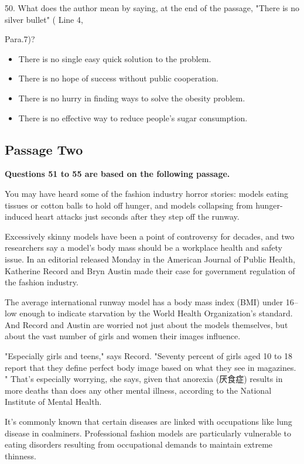 \documentclass[UTF8,11pt]{ctexart}
\begin{document}
50. What does the author mean by saying, at the end of the passage, "There is no silver bullet" ( Line 4,


Para.7)?


\begin{itemize}[leftmargin=2em,itemsep=.2em,topsep=.4em]\item[A.] There is no single easy quick solution to the problem.
\item[B.] There is no hope of success without public cooperation.
\item[C.] There is no hurry in finding ways to solve the obesity problem.
\item[D.] There is no effective way to reduce people's sugar consumption.
\end{itemize}

\subsection*{\textbf{Passage Two}}


\textbf{Questions 51 to 55 are based on the following passage.}


You may have heard some of the fashion industry horror stories: models eating tissues or cotton balls to hold off hunger, and models collapsing from hunger-induced heart attacks just seconds after they step off the runway.


Excessively skinny models have been a point of controversy for decades, and two researchers say a model's body mass should be a workplace health and safety issue. In an editorial released Monday in the American Journal of Public Health, Katherine Record and Bryn Austin made their case for government regulation of the fashion industry.


The average international runway model has a body mass index (BMI) under 16--low enough to indicate starvation by the World Health Organization's standard. And Record and Austin are worried not just about the models themselves, but about the vast number of girls and women their images influence.


"Especially girls and teens," says Record. "Seventy percent of girls aged 10 to 18 report that they define perfect body image based on what they see in magazines. " That's especially worrying, she says, given that anorexia (厌食症) results in more deaths than does any other mental illness, according to the National Institute of Mental Health.


It's commonly known that certain diseases are linked with occupations like lung disease in coalminers. Professional fashion models are particularly vulnerable to eating disorders resulting from occupational demands to maintain extreme thinness.
\end{document}
